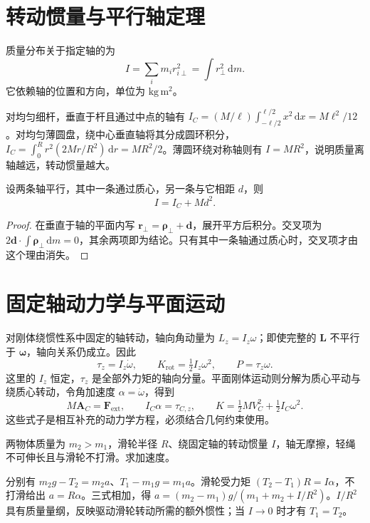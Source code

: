 \documentclass[UTF8,12pt,a4paper,fontset=fandol]{ctexbook}
\begin{document}
\section{转动惯量与平行轴定理}
\begin{definition}[关于指定轴的转动惯量]
质量分布关于指定轴的为
\begin{equation}
 I=\sum_i m_i r_{i\perp}^2=\int r_\perp^2\,\mathrm dm.
 \label{eq:mech-inertia}
\end{equation}
它依赖轴的位置和方向，单位为 $\mathrm{kg\,m^2}$。
\end{definition}
对均匀细杆，垂直于杆且通过中点的轴有 $I_C=(M/\ell)\int_{-\ell/2}^{\ell/2}x^2\,\mathrm dx=M\ell^2/12$。对均匀薄圆盘，绕中心垂直轴将其分成圆环积分，$I_C=\int_0^R r^2(2Mr/R^2)\,\mathrm dr=MR^2/2$。薄圆环绕对称轴则有 $I=MR^2$，说明质量离轴越远，转动惯量越大。

\begin{theorem}[平行轴定理]
设两条轴平行，其中一条通过质心，另一条与它相距 $d$，则
\begin{equation}
 I=I_C+Md^2.
 \label{eq:mech-parallel-axis}
\end{equation}
\end{theorem}
\begin{proof}
在垂直于轴的平面内写 $\mathbf r_\perp=\boldsymbol\rho_\perp+\mathbf d$，展开平方后积分。交叉项为 $2\mathbf d\cdot\int\boldsymbol\rho_\perp\,\mathrm dm=0$，其余两项即为结论。只有其中一条轴通过质心时，交叉项才由这个理由消失。
\end{proof}

\section{固定轴动力学与平面运动}
对刚体绕惯性系中固定的轴转动，轴向角动量为 $L_z=I_z\omega$；即使完整的 $\mathbf L$ 不平行于 $\boldsymbol\omega$，轴向关系仍成立。因此
\begin{equation}
 \tau_z=I_z\dot\omega,\qquad K_{\mathrm{rot}}=\tfrac12I_z\omega^2,
 \qquad P=\tau_z\omega.
 \label{eq:mech-fixed-axis}
\end{equation}
这里的 $I_z$ 恒定，$\tau_z$ 是全部外力矩的轴向分量。平面刚体运动则分解为质心平动与绕质心转动，令角加速度 $\alpha=\dot\omega$，得到
\[
 M\mathbf A_C=\mathbf F_{\mathrm{ext}},\qquad I_C\alpha=\tau_{C,z},\qquad
 K=\tfrac12MV_C^2+\tfrac12I_C\omega^2.
\]
这些式子是相互补充的动力学方程，必须结合几何约束使用。

\begin{example}[具有转动惯量的滑轮]
两物体质量为 $m_2>m_1$，滑轮半径 $R$、绕固定轴的转动惯量 $I$，轴无摩擦，轻绳不可伸长且与滑轮不打滑。求加速度。
\end{example}
\begin{solve}
分别有 $m_2g-T_2=m_2a$、$T_1-m_1g=m_1a$。滑轮受力矩 $(T_2-T_1)R=I\alpha$，不打滑给出 $a=R\alpha$。三式相加，得 $a=(m_2-m_1)g/(m_1+m_2+I/R^2)$。$I/R^2$ 具有质量量纲，反映驱动滑轮转动所需的额外惯性；当 $I\to0$ 时才有 $T_1=T_2$。
\end{solve}
\end{document}
